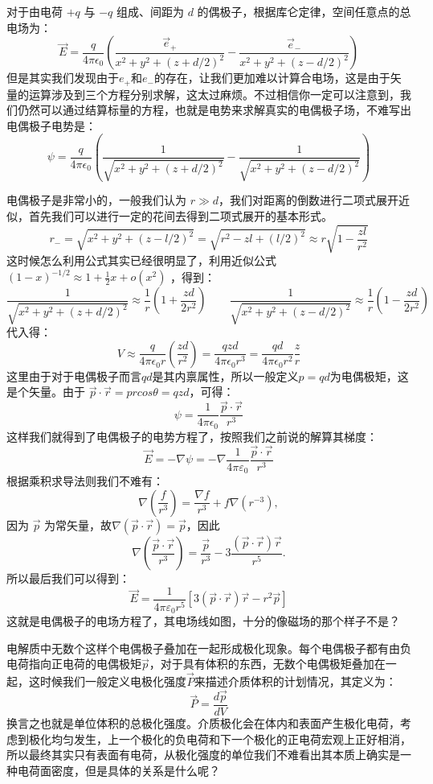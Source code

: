 \documentclass[UTF8]{ctexbook}
\begin{document}
对于由电荷 \(+q\) 与 \(-q\) 组成、间距为 \(d\) 的偶极子，根据库仑定律，空间任意点的总电场为：
\[
 \vec{E} = \frac{q}{4\pi\epsilon_0} \left( \frac{\vec{e}_+}{ {x^2 + y^2 + (z + d/2)^2}} - \frac{\vec{e}_-}{ {x^2 + y^2 + (z - d/2)^2}} \right) 
\]
但是其实我们发现由于$e_+$和$e_-$的存在，让我们更加难以计算合电场，这是由于矢量的运算涉及到三个方程分别求解，这太过麻烦。不过相信你一定可以注意到，我们仍然可以通过结算标量的方程，也就是电势来求解真实的电偶极子场，不难写出电偶极子电势是：
\[
 \psi = \frac{q}{4\pi\epsilon_0} \left( \frac{1}{ \sqrt{x^2 + y^2 + (z +d/2)^2}} - \frac{1}{ \sqrt{x^2 + y^2 + (z - d/2)^2}} \right) 
\]

电偶极子是非常小的，一般我们认为 \(r \gg d\)，我们对距离的倒数进行二项式展开近似，首先我们可以进行一定的花间去得到二项式展开的基本形式。
\[
 r_- = \sqrt{x^2 + y^2 + (z - l/2)^2} = \sqrt{r^2 - zl + (l/2)^2} \approx r\sqrt{1 - \frac{zl}{r^2}} 
\]
这时候怎么利用公式其实已经很明显了，利用近似公式 \((1 - x)^{-1/2} \approx 1 + \frac{1}{2}x+o(x^2)\) ，得到：
\[
\frac{1}{ \sqrt{x^2 + y^2 + (z +d/2)^2}} \approx \frac{1}{r} \left( 1 + \frac{zd}{2r^2} \right) 
\qquad
 \frac{1}{ \sqrt{x^2 + y^2 + (z - d/2)^2}} \approx \frac{1}{r} \left( 1 - \frac{zd}{2r^2} \right) 
\]
代入得：
\[
 V \approx \frac{q}{4\pi\epsilon_0 r} \left( \frac{zd}{r^2} \right) = \frac{qzd}{4\pi\epsilon_0 r^3} =\frac{qd}{4\pi\epsilon_0 r^2}\frac{z}{r}
\]
这里由于对于电偶极子而言$qd$是其内禀属性，所以一般定义$p=qd$为电偶极矩，这是个矢量。由于 \(\vec{p} \cdot \vec{r} = prcos\theta = qzd\)，可得：
\[
 \psi = \frac{1}{4\pi\epsilon_0}\frac{\vec{p}\cdot\vec{r}}{r^3} 
\]
这样我们就得到了电偶极子的电势方程了，按照我们之前说的解算其梯度：
\[
\vec{E}=-\nabla\psi=-\nabla\frac{1}{4\pi\varepsilon_0}\frac{\vec{p}\cdot\vec{r}}{r^3}
\]
根据乘积求导法则我们不难有：
\begin{equation}
\nabla\left(\frac{f}{r^3}\right)
=
\frac{\nabla f}{r^3}+f\nabla\left(r^{-3}\right),
\label{eq:grad-f-over-r3}
\end{equation}
因为 \(\vec{p}\) 为常矢量，故$\nabla(\vec{p}\cdot\vec{r})=\vec{p}$，因此
\[
\nabla\left(\frac{\vec{p}\cdot\vec{r}}{r^3}\right)
=
\frac{\vec{p}}{r^3}
-
3\frac{(\vec{p}\cdot\vec{r})\vec{r}}{r^5}.
\]
所以最后我们可以得到：
\[
\vec{E}
=
\frac{1}{4\pi\varepsilon_0 r^5}
\left[
3(\vec{p}\cdot\vec{r})\vec{r}-r^2\vec{p}
\right]
\]
这就是电偶极子的电场方程了，其电场线如图，十分的像磁场的那个样子不是？

电解质中无数个这样个电偶极子叠加在一起形成极化现象。每个电偶极子都有由负电荷指向正电荷的电偶极矩$\vec{p}$，对于具有体积的东西，无数个电偶极矩叠加在一起，这时候我们一般定义电极化强度$\vec{P}$来描述介质体积的计划情况，其定义为：
\[
\vec{P}=\frac{d\vec{p}}{dV}
\]
换言之也就是单位体积的总极化强度。介质极化会在体内和表面产生极化电荷，考虑到极化均匀发生，上一个极化的负电荷和下一个极化的正电荷宏观上正好相消，所以最终其实只有表面有电荷，从极化强度的单位我们不难看出其本质上确实是一种电荷面密度，但是具体的关系是什么呢？
\end{document}
